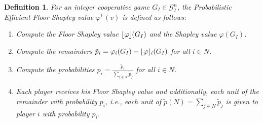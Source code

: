 \documentclass[12pt]{report}
\newcounter{theorem}
\newtheorem{definition}[theorem]{Definition}
\def\phi{\varphi}
\newcommand{\floor}[1]{\left\lfloor #1 \right\rfloor}
\newcommand{\floorphi}{\ensuremath{\floor{\phi}\hspace{-0.5ex}}}
\begin{document}
\begin{definition}
    \label{def:probabilistic_efficient_floor_shapley_value}
    For an integer cooperative game $G_I \in \mathcal{G}_I^n$, the \emph{Probabilistic Efficient Floor Shapley value} $\phi^{\mathbb{E}}(v)$ is defined as follows:
    \begin{enumerate}
        \item Compute the Floor Shapley value $\floorphi(G_I)$ and the Shapley value $\phi(G_I)$.
        \item Compute the remainders $\tilde{p}_i = \phi_i(G_I) - \floorphi_i(G_I)$ for all $i \in N$.
        \item Compute the probabilities $p_i = \frac{\tilde{p}_i}{\sum_{j \in N} \tilde{p}_j}$ for all $i \in N$.
        \item Each player receives his Floor Shapley value and additionally, each unit of the remainder with probability $p_i$, i.e., each unit of $\tilde{p}(N)=\sum_{j \in N} \tilde{p}_j$ is given to player $i$ with probability $p_i$.
    \end{enumerate}
\end{definition}
\end{document}
